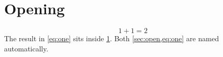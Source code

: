 \documentclass{article}
\begin{document}
\section{Opening}\label{sec:open}
\begin{equation}\label{eq:one}
1+1=2
\end{equation}
The result in \cref{eq:one} sits inside \cref{sec:open}.
Both \cref{sec:open,eq:one} are named automatically.
\end{document}
